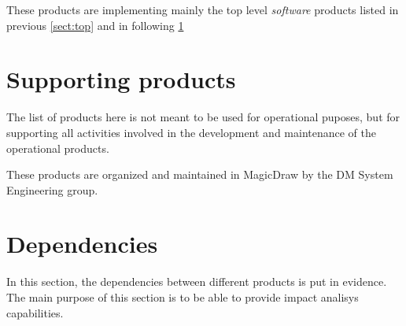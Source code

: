 These products are implementing mainly the top level \textit{software} products listed in previous \ref{sect:top} and in following \ref{sect:sups}


\section{Supporting products}\label{sect:sups}

The list of products here is not meant to be used for operational puposes, but for supporting all activities involved in the development and maintenance of the operational products. 

These products are organized and maintained in MagicDraw by the DM System Engineering group.


\section{Dependencies}\label{sect:deps}

In this section, the dependencies between different products is put in evidence.
The main purpose of this section is to be able to provide impact analisys capabilities.
